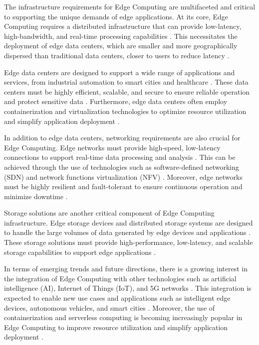 \documentclass[11pt,a4paper]{article}
\begin{document}
The infrastructure requirements for Edge Computing are multifaceted and critical to supporting the unique demands of edge applications. At its core, Edge Computing requires a distributed infrastructure that can provide low-latency, high-bandwidth, and real-time processing capabilities \cite{arxiv:1701.01090}. This necessitates the deployment of edge data centers, which are smaller and more geographically dispersed than traditional data centers, closer to users to reduce latency \cite{arxiv:1805.06695}. 

Edge data centers are designed to support a wide range of applications and services, from industrial automation to smart cities and healthcare \cite{arxiv:2402.13056}. These data centers must be highly efficient, scalable, and secure to ensure reliable operation and protect sensitive data \cite{arxiv:1810.00305}. Furthermore, edge data centers often employ containerization and virtualization technologies to optimize resource utilization and simplify application deployment \cite{arxiv:2101.03533}.

In addition to edge data centers, networking requirements are also crucial for Edge Computing. Edge networks must provide high-speed, low-latency connections to support real-time data processing and analysis \cite{arxiv:2107.13374}. This can be achieved through the use of technologies such as software-defined networking (SDN) and network functions virtualization (NFV) \cite{arxiv:1809.00343}. Moreover, edge networks must be highly resilient and fault-tolerant to ensure continuous operation and minimize downtime \cite{arxiv:2106.10063}.

Storage solutions are another critical component of Edge Computing infrastructure. Edge storage devices and distributed storage systems are designed to handle the large volumes of data generated by edge devices and applications \cite{arxiv:2111.10076}. These storage solutions must provide high-performance, low-latency, and scalable storage capabilities to support edge applications \cite{arxiv:1701.08680}. 

In terms of emerging trends and future directions, there is a growing interest in the integration of Edge Computing with other technologies such as artificial intelligence (AI), Internet of Things (IoT), and 5G networks \cite{arxiv:2004.14850}. This integration is expected to enable new use cases and applications such as intelligent edge devices, autonomous vehicles, and smart cities \cite{arxiv:2101.07930}. Moreover, the use of containerization and serverless computing is becoming increasingly popular in Edge Computing to improve resource utilization and simplify application deployment \cite{arxiv:2109.12983}.
\end{document}
